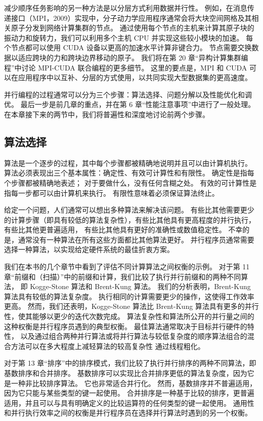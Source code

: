 减少顺序任务影响的另一种方法是以分层方式利用数据并行性。 
例如，在消息传递接口（MPI，2009）实现中，分子动力学应用程序通常会将大块空间网格及其相关原子分发到网络计算集群的节点。 
通过使用每个节点的主机来计算其原子块的振动力和旋转力，我们可以利用多个主机 CPU 并实现这些较小模块的加速。 
每个节点都可以使用 CUDA 设备以更高的加速水平计算非键合力。 节点需要交换数据以适应跨块的力和跨块边界移动的原子。 
我们将在第 20 章“异构计算集群编程”中讨论 MPI-CUDA 联合编程的更多细节。 
这里的要点是，MPI 和 CUDA 可以在应用程序中以互补、分层的方式使用，以共同实现大型数据集的更高速度。

并行编程的过程通常可以分为三个步骤：算法选择、问题分解以及性能优化和调优。 
最后一步是前几章的重点，并在第 6 章“性能注意事项”中进行了一般处理。 
在本章接下来的两节中，我们将普遍性和深度地讨论前两个步骤。

\subsection{算法选择}
算法是一个逐步的过程，其中每个步骤都被精确地说明并且可以由计算机执行。 
算法必须表现出三个基本属性：确定性、有效可计算性和有限性。 
确定性是指每个步骤都被精确地表述； 对于要做什么，没有任何含糊之处。 
有效的可计算性是指每一步都可以由计算机来执行。 有限性意味着必须保证算法终止。

给定一个问题，人们通常可以想出多种算法来解决该问题。 
有些比其他需要更少的计算步骤（即具有较低的算法复杂性），有些比其他具有更高程度的并行执行，有些比其他更普遍适用，
有些比其他具有更好的准确性或数值稳定性。 不幸的是，通常没有一种算法在所有这些方面都比其他算法更好。 
并行程序员通常需要选择一种算法，以实现给定硬件系统的最佳折衷方案。

我们在本书的几个章节中看到了评估不同计算算法之间权衡的示例。 
对于第 11 章“前缀和（扫描）”中的前缀和计算，我们比较了执行并行前缀和的两种不同算法，
即 Kogge-Stone 算法和 Brent-Kung 算法。 我们的分析表明，Brent-Kung 算法具有较低的算法复杂度。 
执行相同的计算需要更少的操作，这使得工作效率更高。 
然而，我们还表明，Kogge-Stone 算法比 Brent-Kung 算法具有更多的并行性，使其能够以更少的迭代次数完成。 
算法复杂性和算法所公开的并行量之间的这种权衡是并行程序员遇到的典型权衡。 
最佳算法通常取决于目标并行硬件的特性，
以及通过组合两种并行算法或将并行算法与较低复杂度的顺序算法组合的混合方法可以在多大程度上减轻算法的较高复杂性 通过线程粗化。

对于第 13 章“排序”中的排序模式，我们比较了执行并行排序的两种不同算法，即基数排序和合并排序。 
基数排序可以实现比合并排序更低的算法复杂度，因为它是一种非比较排序算法。 它也非常适合并行化。 
然而，基数排序并不普遍适用，因为它只能与某些类型的键一起使用。 
合并排序是一种基于比较的排序，更普遍适用，并且可以与具有明确定义的比较运算符的任何类型的键一起使用。 
通用性和并行执行效率之间的权衡是并行程序员在选择并行算法时遇到的另一个权衡。

